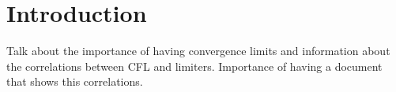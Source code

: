 
\section{Introduction}

Talk about the importance of having convergence limits and information about the correlations between CFL and limiters. Importance of having a document that shows this correlations.
